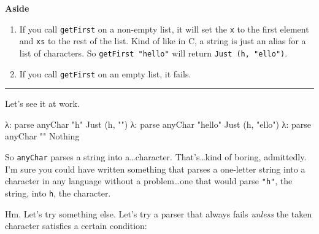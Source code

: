 \documentclass[]{article}
\newenvironment{Shaded}{}{}
\newcommand{\CharTok}[1]{\textcolor[rgb]{0.25,0.44,0.63}{#1}}
\newcommand{\DataTypeTok}[1]{\textcolor[rgb]{0.56,0.13,0.00}{#1}}
\newcommand{\NormalTok}[1]{#1}
\newcommand{\OperatorTok}[1]{\textcolor[rgb]{0.40,0.40,0.40}{#1}}
\newcommand{\StringTok}[1]{\textcolor[rgb]{0.25,0.44,0.63}{#1}}
\begin{document}
\textbf{Aside}

\begin{enumerate}
\def\labelenumi{\arabic{enumi}.}
\tightlist
\item
  If you call \texttt{getFirst} on a non-empty list, it will set the \texttt{x}
  to the first element and \texttt{xs} to the rest of the list. Kind of like in
  C, a string is just an alias for a list of characters. So
  \texttt{getFirst\ "hello"} will return
  \texttt{Just\ (\textquotesingle{}h\textquotesingle{},\ "ello")}.
\item
  If you call \texttt{getFirst} on an empty list, it fails.
\end{enumerate}

\begin{center}\rule{0.5\linewidth}{\linethickness}\end{center}

Let's see it at work.

\begin{Shaded}
\begin{Highlighting}[]
\NormalTok{λ}\OperatorTok{:}\NormalTok{ parse anyChar }\StringTok{"h"}
\DataTypeTok{Just}\NormalTok{ (}\CharTok{\textquotesingle{}h\textquotesingle{}}\NormalTok{, }\StringTok{""}\NormalTok{)}
\NormalTok{λ}\OperatorTok{:}\NormalTok{ parse anyChar }\StringTok{"hello"}
\DataTypeTok{Just}\NormalTok{ (}\CharTok{\textquotesingle{}h\textquotesingle{}}\NormalTok{, }\StringTok{"ello"}\NormalTok{)}
\NormalTok{λ}\OperatorTok{:}\NormalTok{ parse anyChar }\StringTok{""}
\DataTypeTok{Nothing}
\end{Highlighting}
\end{Shaded}

So \texttt{anyChar} parses a string into a\ldots character. That's\ldots kind of
boring, admittedly. I'm sure you could have written something that parses a
one-letter string into a character in any language without a problem\ldots one
that would parse \texttt{"h"}, the string, into
\texttt{\textquotesingle{}h\textquotesingle{}}, the character.

Hm. Let's try something else. Let's try a parser that always fails \emph{unless}
the taken character satisfies a certain condition:
\end{document}
